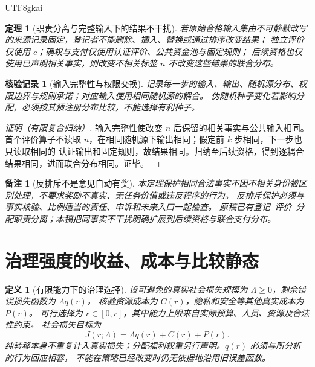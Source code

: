 \documentclass[12pt,a4paper,openany]{report}
\newtheorem{definition}{定义}[chapter]
\newtheorem{theorem}{定理}[chapter]
\newtheorem{remark}{备注}[chapter]
\newtheorem{Certificate}{核验记录}[chapter]
\begin{document}
\begin{CJK*}{UTF8}{gkai}
\begin{theorem}[职责分离与完整输入下的结果不干扰]
\label{thm:separation}
若原始合格输入集由不可静默改写的来源记录固定，登记者不能删除、插入、替换或通过排序改变结果；
独立评价仅使用 $c$；确权与支付仅使用认证评价、公共资金池与固定规则；
后续资格也仅使用已声明相关事实，则改变不相关标签 $n$ 不改变这些结果的联合分布。
\end{theorem}
\begin{Certificate}[输入完整性与权限交换]
记录每一步的输入、输出、随机源分布、权限边界与规则承诺；对应输入使用相同随机源的耦合。
伪随机种子变化若影响分配，必须按其预注册分布比较，不能选择有利种子。
\end{Certificate}
\begin{proof}[证明（有限复合归纳）]
输入完整性使改变 $n$ 后保留的相关事实与公共输入相同。
首个评价算子不读取 $n$，在相同随机源下输出相同；假定前 $k$ 步相同，下一步也只读取相同的
认证输出和固定规则，故结果相同。归纳至后续资格，得到逐耦合结果相同，进而联合分布相同。证毕。
\end{proof}

\begin{remark}[反排斥不是意见自动有奖]
本定理保护相同合法事实不因不相关身份被区别处理，不要求奖励不真实、无任务价值或违反程序的行为。
反排斥保护必须与事实核验、比例适当的责任、申诉和未来入口一起检查。
原稿已有登记--评价--分配职责分离；本稿把同事实不干扰明确扩展到后续资格与联合支付分布。
\end{remark}

\section{治理强度的收益、成本与比较静态}

\begin{definition}[有限能力下的治理选择]
\label{def:audit-choice}
设可避免的真实社会损失规模为 $\Lambda\ge0$，剩余错误损失函数为 $\Lambda q(r)$，
核验资源成本为 $C(r)$，隐私和安全等其他真实成本为 $P(r)$。
可行选择为 $r\in[0,\overline r]$，其中能力上限来自实际预算、人员、资源及合法性约束。
社会损失目标为
\[
 J(r;\Lambda)=\Lambda q(r)+C(r)+P(r).
\]
纯转移本身不重复计入真实损失；分配福利权重另行声明。$q(r)$ 必须与所分析的行为回应相容，
不能在策略已经改变时仍无依据地沿用旧误差函数。
\end{definition}


\end{CJK*}
\end{document}
